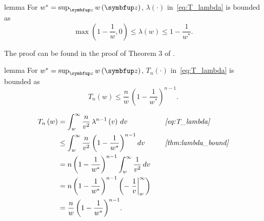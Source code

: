 
\begin{theoremEnd}{lemma}\label{thm:lambda_bound}
  For \(w^* = \sup_{\vz} w\left(\vz\right) \), \(\lambda\left(\cdot\right)\) in~\cref{eq:T_lambda} is bounded as
  \[
   \max\left(1 - \frac{1}{w}, 0\right) \leq \lambda\left(w\right) \leq 1 - \frac{1}{w^*}.
  \]
\end{theoremEnd}
\begin{proofEnd}
  The proof can be found in the proof of Theorem 3 of \citet{Smith96exacttransition}.
\end{proofEnd}

\begin{theoremEnd}{lemma}\label{thm:tn_bound}
  For \(w^* = \sup_{\vz} w\left(\vz\right) \), \(T_n\left(\cdot\right)\) in~\cref{eq:T_lambda} is bounded as
  \[
  T_n\left( w \right) \leq \frac{n}{w} \, {\left(1 - \frac{1}{w^*}\right)}^{n-1}.
  \]
\end{theoremEnd}
\begin{proofEnd}
  \begin{alignat*}{2}
    T_n\left(w\right) 
    &= \int_w^{\infty} \frac{n}{v^2} \, \lambda^{n-1}\left(v\right)\,dv
    &&\quad\text{\textit{\cref{eq:T_lambda}}}
    \\
    &\leq \int_w^{\infty} \frac{n}{v^2} \, {\left(1 - \frac{1}{w^*}\right)}^{n-1}\,dv
    &&\quad\text{\textit{\cref{thm:lambda_bound}}}
    \\
    &= n \, {\left(1 - \frac{1}{w^*}\right)}^{n-1}  \int_w^{\infty} \frac{1}{v^2} \,dv
    \\
    &= n \, {\left(1 - \frac{1}{w^*}\right)}^{n-1}  \left( {-\left.\frac{1}{v}\right\rvert^{\infty}_{w}} \right)
    \\
    &= \frac{n}{w} \, {\left(1 - \frac{1}{w^*}\right)}^{n-1}.
  \end{alignat*}
\end{proofEnd}

